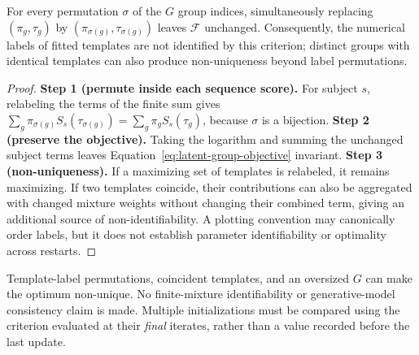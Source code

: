 \begin{proposition}
\label{prop:label-symmetry-paper}
For every permutation $\sigma$ of the $G$ group indices, simultaneously replacing $(\pi_g,\tau_g)$ by $(\pi_{\sigma(g)},\tau_{\sigma(g)})$ leaves $\mathcal F$ unchanged. Consequently, the numerical labels of fitted templates are not identified by this criterion; distinct groups with identical templates can also produce non-uniqueness beyond label permutations.
\end{proposition}
\begin{proof}
\textbf{Step 1 (permute inside each sequence score).}
For subject $s$, relabeling the terms of the finite sum gives $\sum_g\pi_{\sigma(g)}S_s(\tau_{\sigma(g)})=\sum_g\pi_gS_s(\tau_g)$, because $\sigma$ is a bijection.
\textbf{Step 2 (preserve the objective).}
Taking the logarithm and summing the unchanged subject terms leaves Equation~\eqref{eq:latent-group-objective} invariant.
\textbf{Step 3 (non-uniqueness).}
If a maximizing set of templates is relabeled, it remains maximizing. If two templates coincide, their contributions can also be aggregated with changed mixture weights without changing their combined term, giving an additional source of non-identifiability. A plotting convention may canonically order labels, but it does not establish parameter identifiability or optimality across restarts.
\end{proof}

Template-label permutations, coincident templates, and an oversized $G$ can make the optimum non-unique. No finite-mixture identifiability or generative-model consistency claim is made. Multiple initializations must be compared using the criterion evaluated at their \emph{final} iterates, rather than a value recorded before the last update.
